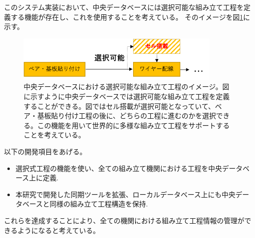このシステム実装において、中央データベースには選択可能な組み立て工程を定義する機能が存在し、これを使用することを考えている。
そのイメージを図\ref{optional_stage}に示す。

\begin{figure}[bpt]\centering
\includegraphics[width=10cm]{./optional_stage.png}
\caption[中央データベースにおける選択可能な組み立て工程のイメージ]{中央データベースにおける選択可能な組み立て工程のイメージ。図に示すように中央データベースでは選択可能な組み立て工程を定義することができる。図ではセル搭載が選択可能となっていて、ベア・基板貼り付け工程の後に、どちらの工程に進むのかを選択できる。この機能を用いて世界的に多様な組み立て工程をサポートすることを考えている。}
\label{optional_stage}
\end{figure}

以下の開発項目をあげる。
\begin{itemize}
  \item 選択式工程の機能を使い、全ての組み立て機関における工程を中央データベース上に定義.
  \item 本研究で開発した同期ツールを拡張、ローカルデータベース上にも中央データベースと同様の組み立て工程構造を保持.
\end{itemize}

これらを達成することにより、全ての機関における組み立て工程情報の管理ができるようになると考えている。


